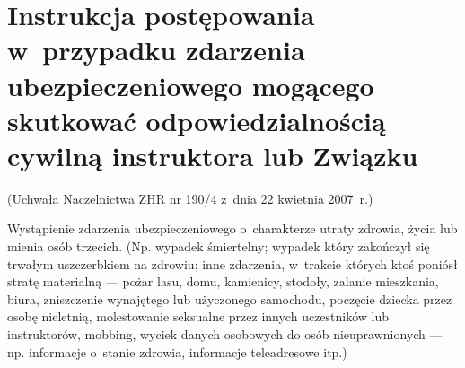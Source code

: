 \section{Instrukcja postępowania w~przypadku zdarzenia ubezpieczeniowego mogącego skutkować odpowiedzialnością cywilną instruktora lub Związku\label{instrukcja-postepowania-wypadek}}
\begin{center}(Uchwała Naczelnictwa ZHR nr 190/4 z~dnia 22 kwietnia 2007~r.)\end{center}

Wystąpienie zdarzenia ubezpieczeniowego o~charakterze utraty zdrowia, życia lub mienia osób trzecich. (Np. wypadek śmiertelny; wypadek który zakończył się trwałym uszczerbkiem na zdrowiu; inne zdarzenia, w~trakcie których ktoś poniósł stratę materialną --- pożar lasu, domu, kamienicy, stodoły, zalanie mieszkania, biura, zniszczenie wynajętego lub użyczonego samochodu, poczęcie dziecka przez osobę nieletnią, molestowanie seksualne przez innych uczestników lub instruktorów, mobbing, wyciek danych osobowych do osób nieuprawnionych --- np. informacje o~stanie zdrowia, informacje teleadresowe itp.)

